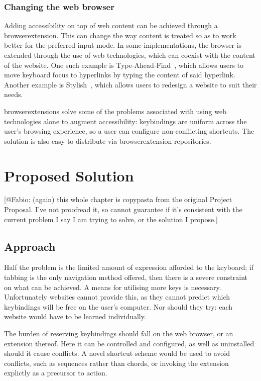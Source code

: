 \documentclass[11pt,openright,a4paper]{report}
\begin{document}
\subsubsection{Changing the web browser}
\label{changingwebbrowser}
Adding accessibility on top of web content can be achieved through a \gls{browserextension}. This can change the way content is treated so as to work better for the preferred input mode. In some implementations, the browser is extended through the use of web technologies, which can coexist with the content of the website.
One such example is Type-Ahead-Find~\cite{typeaheadfind}, which allows users to move keyboard focus to hyperlinks by typing the content of said hyperlink. Another example is Stylish~\cite{stylish}, which allows users to redesign a website to suit their needs.

\Glspl{browserextension} solve some of the problems associated with using web technologies alone to augment accessibility: \glspl{keybinding} are uniform across the user's browsing experience, so a user can configure non-conflicting shortcuts. The solution is also easy to distribute via \gls{browserextension} repositories.
\section{Proposed Solution}
[@Fabio: (again) this whole chapter is copypasta from the original Project Proposal. I've not proofread it, so cannot guarantee if it's consistent with the current problem I say I am trying to solve, or the solution I propose.]
\subsection{Approach}
Half the problem is the limited amount of expression afforded to the keyboard; if tabbing is the only navigation method offered, then there is a severe constraint on what can be achieved. A means for utilising more keys is necessary. Unfortunately websites cannot provide this, as they cannot predict which \glspl{keybinding} will be free on the user's computer. Nor should they try: each website would have to be learned individually.

The burden of reserving \glspl{keybinding} should fall on the web browser, or an extension thereof. Here it can be controlled and configured, as well as uninstalled should it cause conflicts. A novel shortcut scheme would be used to avoid conflicts, such as sequences rather than chords, or invoking the extension explictly as a precursor to action.
\end{document}
